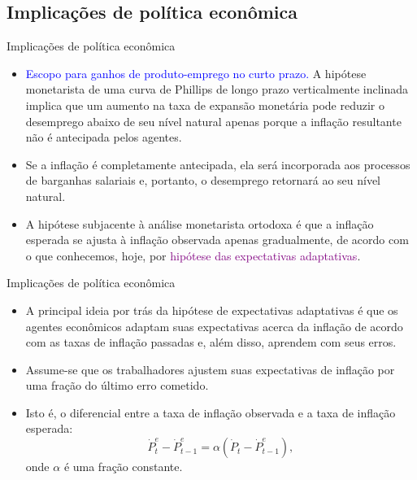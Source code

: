 \documentclass[10pt]{beamer}
\begin{document}
\subsection{Implicações de política econômica}
\begin{frame}{Implicações de política econômica}
    \begin{itemize}
        \item \textcolor{blue}{Escopo para ganhos de produto-emprego no curto prazo.} A hipótese monetarista de uma curva de Phillips de longo prazo verticalmente inclinada implica que um aumento na taxa de expansão monetária pode reduzir o desemprego abaixo de seu nível natural apenas porque a inflação resultante não é antecipada pelos agentes.
        \bigskip
        \item Se a inflação é completamente antecipada, ela será incorporada aos processos de barganhas salariais e, portanto, o desemprego retornará ao seu nível natural.
        \bigskip
        \item A hipótese subjacente à análise monetarista ortodoxa é que a inflação esperada se ajusta à inflação observada apenas gradualmente, de acordo com o que conhecemos, hoje, por \textcolor{purple}{hipótese das expectativas adaptativas}.
    \end{itemize}    
\end{frame}

\begin{frame}{Implicações de política econômica}
    \begin{itemize}
        \item A principal ideia por trás da hipótese de expectativas adaptativas é que os agentes econômicos adaptam suas expectativas acerca da inflação de acordo com as taxas de inflação passadas e, além disso, aprendem com seus erros.
        \bigskip
        \item Assume-se que os trabalhadores ajustem suas expectativas de inflação por uma fração do último erro cometido.
        \bigskip
        \item Isto é, o diferencial entre a taxa de inflação observada e a taxa de inflação esperada:
        \begin{equation}
            \dot{P}_t^e - \dot{P}_{t-1}^e = \alpha (\dot{P}_t - \dot{P}_{t-1}^e),
            \label{eq3}
        \end{equation}
        onde $\alpha$ é uma fração constante.
    \end{itemize}    
\end{frame}
\end{document}
